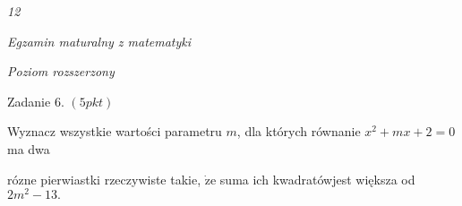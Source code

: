 \documentclass[a4paper,12pt]{article}
\begin{document}
{\it 12}

{\it Egzamin maturalny z matematyki}

{\it Poziom rozszerzony}

Zadanie 6. $(5pkt)$

Wyznacz wszystkie wartości parametru $m$, dla których równanie $x^{2}+mx+2=0$ ma dwa

rózne pierwiastki rzeczywiste takie, $\dot{\mathrm{z}}\mathrm{e}$ suma ich kwadratówjest większa od $2m^{2}-13.$
\end{document}
